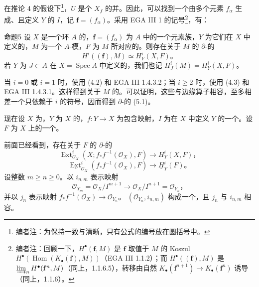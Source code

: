 在推论 4 的假设下\footnote{编者注：为保持一致与清晰，只有公式的编号放在圆括号中。}，$U$ 是个 $X_f$ 的并。因此，可以找到一个由多个元素 $f_\alpha$ 生成、且定义 $Y$ 的 $I$，记 $\mathbf f=(f_\alpha)$。采用 EGA III 1 的记号\footnote{编者注：回顾一下，$H^\bullet(\mathbf f,M)$ 是 $\mathbf f$ 取值于 $M$ 的 Koszul 
$H^\bullet(\operatorname{Hom}(K_\bullet(\mathbf f),M))$（EGA III 1.1.2）；而 $H^\bullet((\mathbf f),M)$ 是
$\varinjlim_n H^\bullet(\mathbf f^n,M)$（同上，1.1.6.5），转移由自然
$K_\bullet(\mathbf f^{n+1})\to K_\bullet(\mathbf f^n)$ 诱导（同上，1.1.6）。}，有：
\begin{SGAresult}{命题}{5}
设 $X$ 是一个环 $A$ 的，$\mathbf f=(f_\alpha)$ 为 $A$ 中的一个元素族，$Y$ 为它们在 $X$ 中定义的，$M$ 为一个 $A$-模，$F$ 为 $M$ 所对应的。则存在关于 $M$ 的 $\partial$-的
\[
H^i((\mathbf f),M)\simeq H_Y^i(X,F)。\tag{5.1}
\]
若 $Y$ 为 $J\subset A$ 在 $X=\operatorname{Spec}A$ 中定义的，我们也记
$H_J^i(M)=H_Y^i(X,F)$。
\end{SGAresult}
当 $i=0$ 或 $i=1$ 时，使用 (4.2) 和 EGA III 1.4.3.2；当 $i\ge2$ 时，使用 (4.3) 和 EGA III 1.4.3.1。这样得到关于 $M$ 的。可以证明，这些与边缘算子相容，至多相差一个只依赖于 $i$ 的符号，因而得到 $\partial$-的 (5.1)。

现在设 $X$ 为，$Y$ 为 $X$ 的，$f:Y\to X$ 为包含映射，$I$ 为在 $X$ 中定义 $Y$ 的一个。设 $F$ 为 $X$ 上的一个。

前面已经看到，存在关于 $F$ 的 $\partial$-的
\[
\operatorname{Ext}_{\mathcal O_X}^i(X;f_*f^{-1}(\mathcal O_X),F)
\longrightarrow H_Y^i(X,F)，\tag{$*$}
\]
\[
\underline{\operatorname{Ext}}_{\mathcal O_X}^i(f_*f^{-1}(\mathcal O_X),F)
\longrightarrow\underline H_Y^i(F)。\tag{$**$}
\]
设整数 $m\ge n\ge0$。以 $i_{n,m}$ 表示映射
\[
\mathcal O_{Y_m}=\mathcal O_X/I^{m+1}
\longrightarrow\mathcal O_X/I^{n+1}=\mathcal O_{Y_n}，
\]
并以 $j_n$ 表示映射 $f_*f^{-1}(\mathcal O_X)\to\mathcal O_{Y_n}$。
$(\mathcal O_{Y_n},i_{n,m})$ 构成一个，且 $j_n$ 与 $i_{n,m}$ 相容。

